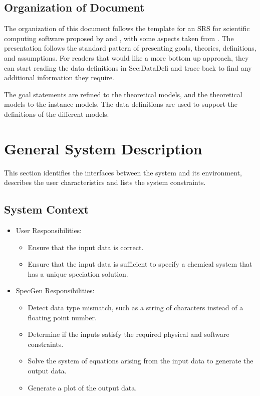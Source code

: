 \documentclass[12pt]{article}
\newcommand{\progname}{SpecGen} %
\begin{document}
\subsection{Organization of Document}
The organization of this document follows the template for an SRS for scientific computing software proposed by \cite{SmithAndLai2005} and \cite{Koothoor2013}, with some aspects taken from \cite{RobertsonAndRobertson1999Vol}. The presentation follows the standard pattern of presenting goals, theories, definitions, and assumptions. For readers that would like a more bottom up approach, they can start reading the data definitions in Sec:DataDefi and trace back to find any additional information they require.

The goal statements are refined to the theoretical models, and the theoretical models to the instance models. The data definitions are used to support the definitions of the different models.

\section{General System Description}
This section identifies the interfaces between the system and its environment,
describes the user characteristics and lists the system constraints.

\subsection{System Context}

\begin{itemize}
\item User Responsibilities:
\begin{itemize}
\item Ensure that the input data is correct.
\item Ensure that the input data is sufficient to specify a chemical system that has a unique speciation solution.
\end{itemize}
\item \progname{} Responsibilities:
\begin{itemize}
\item Detect data type mismatch, such as a string of characters instead of a
  floating point number.
\item Determine if the inputs satisfy the required physical and software constraints.
\item Solve the system of equations arising from the input data to generate the output data.
\item Generate a plot of the output data.
\end{itemize}
\end{itemize}
\end{document}
